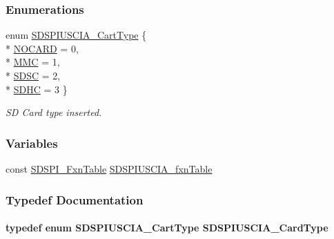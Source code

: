 \subsubsection*{Enumerations}
\begin{DoxyCompactItemize}
\item 
enum \hyperlink{_s_d_s_p_i_u_s_c_i_a_8h_ad08dd3019effc5263edc6374ce89d87a}{S\+D\+S\+P\+I\+U\+S\+C\+I\+A\+\_\+\+Cart\+Type} \{ \\*
\hyperlink{_s_d_s_p_i_u_s_c_i_a_8h_ad08dd3019effc5263edc6374ce89d87aa422cdc20ba86c8cdcf1f0fd2318a1cfc}{N\+O\+C\+A\+R\+D} = 0, 
\\*
\hyperlink{_s_d_s_p_i_u_s_c_i_a_8h_ad08dd3019effc5263edc6374ce89d87aaa7d8fca3406f36682514f0384d910fac}{M\+M\+C} = 1, 
\\*
\hyperlink{_s_d_s_p_i_u_s_c_i_a_8h_ad08dd3019effc5263edc6374ce89d87aa87550a2102744c14e5e2e0ed39cc04b2}{S\+D\+S\+C} = 2, 
\\*
\hyperlink{_s_d_s_p_i_u_s_c_i_a_8h_ad08dd3019effc5263edc6374ce89d87aab27db2a19a825c3e6f1513cdab7c81ea}{S\+D\+H\+C} = 3
 \}
\begin{DoxyCompactList}\small\item\em S\+D Card type inserted. \end{DoxyCompactList}\end{DoxyCompactItemize}
\subsubsection*{Variables}
\begin{DoxyCompactItemize}
\item 
const \hyperlink{struct_s_d_s_p_i___fxn_table}{S\+D\+S\+P\+I\+\_\+\+Fxn\+Table} \hyperlink{_s_d_s_p_i_u_s_c_i_a_8h_a2aec6a71bc3b39fc0b4ad8561babaf2a}{S\+D\+S\+P\+I\+U\+S\+C\+I\+A\+\_\+fxn\+Table}
\end{DoxyCompactItemize}


\subsubsection{Typedef Documentation}
\paragraph[{S\+D\+S\+P\+I\+U\+S\+C\+I\+A\+\_\+\+Card\+Type}]{\setlength{\rightskip}{0pt plus 5cm}typedef enum {\bf S\+D\+S\+P\+I\+U\+S\+C\+I\+A\+\_\+\+Cart\+Type}  {\bf S\+D\+S\+P\+I\+U\+S\+C\+I\+A\+\_\+\+Card\+Type}}\label{_s_d_s_p_i_u_s_c_i_a_8h_a5852060f107db1a20619f34ec6bc1f07}


